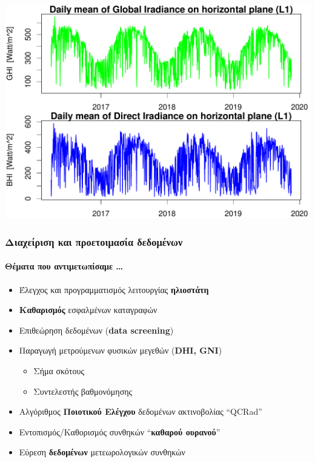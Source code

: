 \documentclass[hyperref={pdfpagelabels=false}]{beamer}
\begin{document}
\begin{frame}%
\begin{center}
    \includegraphics[width=1\textwidth]{files/timeser.pdf}
\end{center}
\end{frame}





\begin{frame}%
\frametitle{Διαχείριση και προετοιμασία δεδομένων}
\framesubtitle{Θέματα που αντιμετωπίσαμε \ldots}

    \begin{itemize}
        \item <1->Έλεγχος και προγραμματισμός λειτουργίας \textbf{ηλιοστάτη}
        \item <2->\textbf{Καθαρισμός} εσφαλμένων καταγραφών
        \item <3->Επιθεώρηση δεδομένων (\textbf{data screening})
        \item <4->Παραγωγή μετρούμενων φυσικών μεγεθών (\textbf{DHI, GNI})
        \begin{itemize}
            \item Σήμα σκότους
            \item Συντελεστής βαθμονόμησης
        \end{itemize}
        \item <5->Αλγόριθμος \textbf{Ποιοτικού Ελέγχου} δεδομένων ακτινοβολίας ``QCRad''
        \item <6->Εντοπισμός/Καθορισμός συνθηκών ``\textbf{καθαρού ουρανού}''
        \item <7->Εύρεση \textbf{δεδομένων} μετεωρολογικών συνθηκών
    \end{itemize}

\end{frame}
\end{document}
